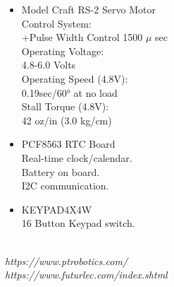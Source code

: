 \begin{minipage}[t]{.31\linewidth}
	\begin{itemize}
		\setlength\itemsep{-0.3em}
		\item Model Craft RS-2 \- Servo Motor \\
		Control System:\\
		+Pulse Width Control 1500 $\mu$ sec \\
		Operating Voltage:\\ 
		4.8-6.0 Volts \\
		Operating Speed (4.8V):\\
		0.19sec/60° at no load \\
		Stall Torque (4.8V):\\
		42 oz/in (3.0 kg/cm) \\
		\item PCF8563 RTC Board \\
		Real-time clock/calendar. \\ 
		Battery on board. \\
		I2C communication. \\
		\item KEYPAD4X4W \\
		16 Button Keypad switch. \\
	\end{itemize}
\end{minipage}\\
{\it https://www.ptrobotics.com/} \\
{\it https://www.futurlec.com/index.shtml} \\
\\
